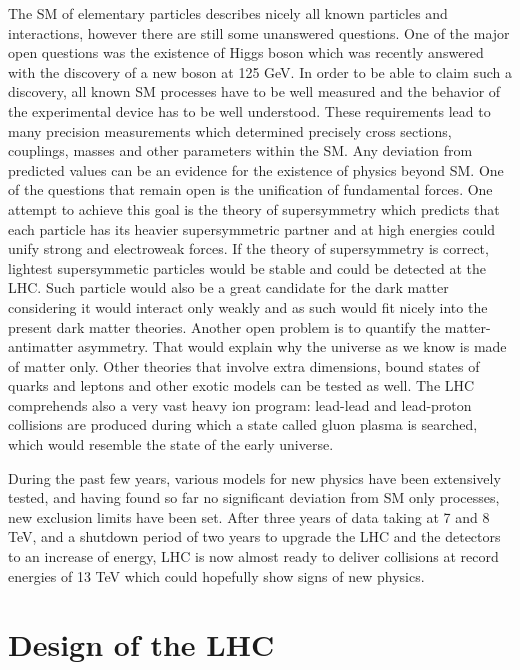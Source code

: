 The SM of elementary particles describes nicely all known particles and interactions, however there are still some unanswered questions. One of the major open questions was the existence of Higgs boson which was recently answered with the discovery of a new boson at 125 GeV. In order to be able to claim such a discovery, all known SM processes have to be well measured and the behavior of the experimental device has to be well understood. These requirements lead to many precision measurements which determined precisely cross sections, couplings, masses and other parameters within the SM. Any deviation from predicted values can be an evidence for the existence of physics beyond SM. One of the questions that remain open is the unification of fundamental forces. One attempt to achieve this goal is the theory of supersymmetry which predicts that each particle has its heavier supersymmetric partner and at high energies could unify strong and electroweak forces. If the theory of supersymmetry is correct, lightest supersymmetic particles would be stable and could be detected at the LHC. Such particle would also be a great candidate for the dark matter considering it would interact only weakly and as such would fit nicely into the present dark matter theories. Another open problem is to quantify the matter-antimatter asymmetry. That would explain why the universe as we know is made of matter only. Other theories that involve extra dimensions, bound states of quarks and leptons and other exotic models can be tested as well. The LHC comprehends also a very vast  heavy ion program: lead-lead and lead-proton collisions are produced during which a state called gluon plasma is searched, which would resemble the state of the early universe.
\par During the past few years, various models for new physics have been extensively tested, and having found so far no significant deviation from SM only processes, new exclusion limits have been set. After three years of data taking at 7 and 8 TeV, and a shutdown period of two years to upgrade the LHC and the detectors to an increase of energy, LHC is now almost ready to deliver collisions at record energies of 13 TeV which could hopefully show signs of new physics.        


\section{Design of the LHC}

